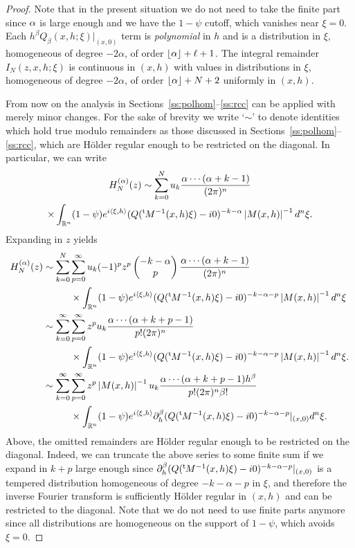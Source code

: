 \documentclass[JEP,XML,SOM,Unicode]{cedram}
\theoremstyle{definition}
\let\cv\alpha
\let\Re\relax
\DeclareMathOperator{\Re}{Re}
\newcommand{\module}[1]{\left|#1\right|}
\newcommand{\plancher}[1]{\left \lfloor #1 \right \rfloor }
\newcommand{\secs}[2]{Sections~\ref{#1}--\ref{#2}}
\renewcommand{\t}{{{}^{\mathrm{t}\mkern-2mu}}}
\begin{document}
\begin{proof}
Note that in the present situation we do not need to take the finite part since $\Re\cv$ is large enough and we have the $1-\psi$ cutoff, which vanishes near $\xi=0$.
Each $h^\beta Q_\beta(x,h;\xi) |_{(x,0)}$
term is \emph{polynomial} in $h$ and is a distribution in $\xi$, homogeneous of degree $-2\cv$, of order $\plancher{\Re\cv}+\ell+1$.
The integral remainder
$I_N(z,x,h;\xi)$ is continuous in $(x,h)$ with values in distributions in $\xi$, homogeneous of degree $-2\cv$,
of order $\plancher{\Re\cv}+N+2$ uniformly in $(x,h)$.

From now on the analysis in \secs{ss:polhom}{ss:rcc} can be applied with merely minor changes. For the sake of brevity we write `$\sim$' to denote identities which hold true modulo remainders as those discussed in \secs{ss:polhom}{ss:rcc}, which are Hölder regular enough to be restricted on the diagonal. In particular, we can write
\begin{multline*}
H_N^{(\cv)}(z) \sim \sum_{k=0}^N u_k \frac{\cv\cdots(\cv+k-1)}{(2\pi)^n}\\
\times\int_{\mathbb{R}^n} (1-\psi) e^{i\left\langle\xi,h \right\rangle}
(Q(\t M^{-1}(x,h)\xi)-i0)^{-k-\cv} \module{M(x,h)}^{-1} d^n\xi.
\end{multline*}
Expanding in $z$ yields
\[
\begin{aligned}
H_N^{(\cv)}(z)&\sim \sum_{k=0}^N\sum_{p=0}^\infty u_k (-1)^pz^p \begin{pmatrix}
-k-\cv
\\
p
\end{pmatrix} \frac{\cv\cdots(\cv+k-1)}{(2\pi)^n} \\
&\hspace*{1cm} \times \int_{\mathbb{R}^n}(1-\psi) e^{i\left\langle\xi,h \right\rangle}
(Q(\t M^{-1}(x,h)\xi)-i0)^{-k-\cv-p} \module{M(x,h)}^{-1} d^n\xi
\\ & \sim \sum_{k=0}^\infty \sum_{p=0}^\infty z^p u_k \frac{\cv\cdots(\cv+k+p-1)}{p!(2\pi)^n} \\
&\hspace*{1cm}\times\int_{\mathbb{R}^n} (1-\psi)e^{i\left\langle\xi,h \right\rangle}
(Q(\t M^{-1}(x,h)\xi)-i0)^{-k-\cv-p} \module{M(x,h)}^{-1} d^n\xi.
\\ & \sim \sum_{k=0}^\infty \sum_{p=0}^\infty z^p \module{M(x,h)}^{-1} u_k \frac{\cv\cdots(\cv+k+p-1)h^\beta}{p!(2\pi)^n\beta!} \\
&\hspace*{1cm}\times\int_{\mathbb{R}^n}(1-\psi) e^{i\left\langle\xi,h \right\rangle}
\partial_h^\beta(Q(\t M^{-1}(x,h)\xi)-i0)^{-k-\cv-p}|_{(x,0)} d^n\xi.
\end{aligned}
\]
Above, the omitted remainders are Hölder regular enough to be restricted on the diagonal. Indeed, we can truncate the above series to some finite sum if we expand in $k+p$ large enough since $\partial_h^\beta(Q(\t M^{-1}(x,h)\xi)-i0)^{-k-\cv-p}|_{(x,0)} $ is a tempered distribution homogeneous of degree $-k-\cv-p $ in $\xi$, and therefore the inverse Fourier transform is sufficiently Hölder regular in $(x,h)$ and can be restricted to the diagonal.
Note that we do not need to use finite parts anymore since all distributions are homogeneous on the support of $1-\psi$, which avoids $\xi=0$.


\end{proof}
\end{document}

